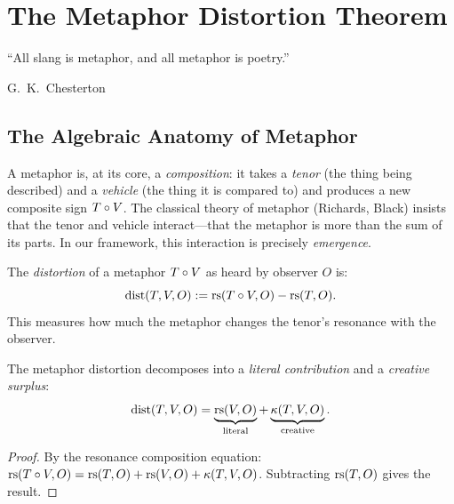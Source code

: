 

\chapter{The Metaphor Distortion Theorem}
\label{ch:metaphor}

\epigraph{``All slang is metaphor, and all metaphor is poetry.''}{G.\ K.\ Chesterton}

\section{The Algebraic Anatomy of Metaphor}

A metaphor is, at its core, a \emph{composition}: it takes a
\emph{tenor} (the thing being described) and a \emph{vehicle} (the thing
it is compared to) and produces a new composite sign $T \circ V$.
The classical theory of metaphor (Richards, Black) insists that the
tenor and vehicle interact---that the metaphor is more than the sum of
its parts.  In our framework, this interaction is precisely
\emph{emergence}.

\begin{definition}
The \emph{distortion} of a metaphor $T \circ V$ as heard by
observer $O$ is:
\[
  \mathrm{dist}(T, V, O) :=
  \mathrm{rs}(T \circ V, O) - \mathrm{rs}(T, O).
\]
This measures how much the metaphor changes the tenor's resonance
with the observer.
\end{definition}

\begin{theorem}
\label{thm:distortion-decomp}
The metaphor distortion decomposes into a \emph{literal contribution}
and a \emph{creative surplus}:
\[
  \mathrm{dist}(T, V, O) = \underbrace{\mathrm{rs}(V, O)}_{\text{literal}}
    + \underbrace{\kappa(T, V, O)}_{\text{creative}}.
\]
\end{theorem}

\begin{proof}
By the resonance composition equation:
$\mathrm{rs}(T \circ V, O) = \mathrm{rs}(T, O) + \mathrm{rs}(V, O) + \kappa(T, V, O)$.
Subtracting $\mathrm{rs}(T, O)$ gives the result.
\end{proof}

